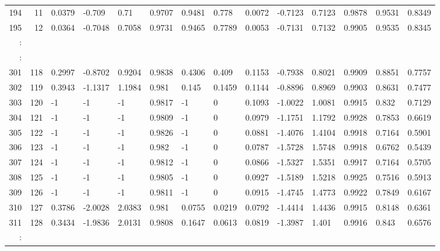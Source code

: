 \begin{table}[p]
{\begin{minipage}{\textheight}
\begin{tabular}{rr||lll|lll||lll|lll}
194    & 11   & 0.0379  & -0.709  & 0.71   & 0.9707 & 0.9481 & 0.778  & 0.0072  & -0.7123 & 0.7123 & 0.9878 & 0.9531 & 0.8349 \\
195    & 12   & 0.0364  & -0.7048 & 0.7058 & 0.9731 & 0.9465 & 0.7789 & 0.0053  & -0.7131 & 0.7132 & 0.9905 & 0.9535 & 0.8345 \\
:      &      &         &         &        &        &        &        &         &         &        &        &        &        \\
\hline
:      &      &         &         &        &        &        &        &         &         &        &        &        &        \\
301    & 118  & 0.2997  & -0.8702 & 0.9204 & 0.9838 & 0.4306 & 0.409  & 0.1153  & -0.7938 & 0.8021 & 0.9909 & 0.8851 & 0.7757 \\
302    & 119  & 0.3943  & -1.1317 & 1.1984 & 0.981  & 0.145  & 0.1459 & 0.1144  & -0.8896 & 0.8969 & 0.9903 & 0.8631 & 0.7477 \\
303    & 120  & -1      & -1      & -1     & 0.9817 & -1     & 0      & 0.1093  & -1.0022 & 1.0081 & 0.9915 & 0.832  & 0.7129 \\
304    & 121  & -1      & -1      & -1     & 0.9809 & -1     & 0      & 0.0979  & -1.1751 & 1.1792 & 0.9928 & 0.7853 & 0.6619 \\
305    & 122  & -1      & -1      & -1     & 0.9826 & -1     & 0      & 0.0881  & -1.4076 & 1.4104 & 0.9918 & 0.7164 & 0.5901 \\
306    & 123  & -1      & -1      & -1     & 0.982  & -1     & 0      & 0.0787  & -1.5728 & 1.5748 & 0.9918 & 0.6762 & 0.5439 \\
307    & 124  & -1      & -1      & -1     & 0.9812 & -1     & 0      & 0.0866  & -1.5327 & 1.5351 & 0.9917 & 0.7164 & 0.5705 \\
308    & 125  & -1      & -1      & -1     & 0.9805 & -1     & 0      & 0.0927  & -1.5189 & 1.5218 & 0.9925 & 0.7516 & 0.5913 \\
309    & 126  & -1      & -1      & -1     & 0.9811 & -1     & 0      & 0.0915  & -1.4745 & 1.4773 & 0.9922 & 0.7849 & 0.6167 \\
310    & 127  & 0.3786  & -2.0028 & 2.0383 & 0.981  & 0.0755 & 0.0219 & 0.0792  & -1.4414 & 1.4436 & 0.9915 & 0.8148 & 0.6361 \\
311    & 128  & 0.3434  & -1.9836 & 2.0131 & 0.9808 & 0.1647 & 0.0613 & 0.0819  & -1.3987 & 1.401  & 0.9916 & 0.843  & 0.6576 \\
:      &      &         &         &        &        &        &        &         &         &        &        &        &        \\

\end{tabular}
\end{minipage}}
\end{table}
